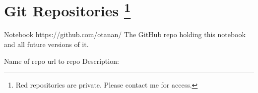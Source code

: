 \chapter*{Git Repositories%
    \footnote{Red repositories are private. Please contact me for access.}
}

\begin{privaterepo}{Notebook}
{https://github.com/otanan/}
    The GitHub repo holding this notebook and all future versions of it.  
\end{privaterepo}

\begin{repo}{Name of repo}
{url to repo}
    Description:
\end{repo}